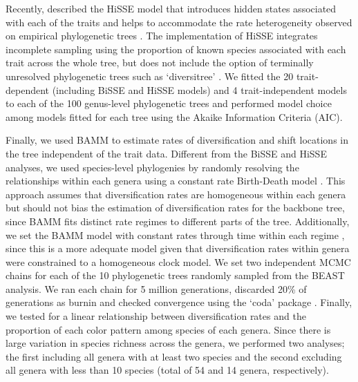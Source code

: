 Recently, \citet{beaulieu_detecting_2016} described the HiSSE model that introduces hidden states associated with each of the traits and helps to accommodate the rate heterogeneity observed on empirical phylogenetic trees \citep{rabosky_2015, beaulieu_detecting_2016}. The implementation of HiSSE integrates incomplete sampling using the proportion of known species associated with each trait across the whole tree, but does not include the option of terminally unresolved phylogenetic trees such as `diversitree' \citep{fitzjohn_2012}. We fitted the 20 trait-dependent (including BiSSE and HiSSE models) and 4 trait-independent models to each of the 100 genus-level phylogenetic trees and performed model choice among models fitted for each tree using the Akaike Information Criteria (AIC).

Finally, we used BAMM \citep{rabosky_2014} to estimate rates of diversification and shift locations in the tree independent of the trait data. Different from the BiSSE and HiSSE analyses, we used species-level phylogenies by randomly resolving the relationships within each genera using a constant rate Birth-Death model \citep{kuhn_simple_2011}. This approach assumes that diversification rates are homogeneous within each genera but should not bias the estimation of diversification rates for the backbone tree, since BAMM fits distinct rate regimes to different parts of the tree. Additionally, we set the BAMM model with constant rates through time within each regime \citep[similar to MEDUSA –][]{Alfaro_2009}, since this is a more adequate model given that diversification rates within genera were constrained to a homogeneous clock model. We set two independent MCMC chains for each of the 10 phylogenetic trees randomly sampled from the BEAST analysis. We ran each chain for 5 million generations, discarded 20\% of generations as burnin and checked convergence using the `coda' package \citep{plummer_2006}. Finally, we tested for a linear relationship between diversification rates and the proportion of each color pattern among species of each genera. Since there is large variation in species richness across the genera, we performed two analyses; the first including all genera with at least two species and the second excluding all genera with less than 10 species (total of 54 and 14 genera, respectively).

